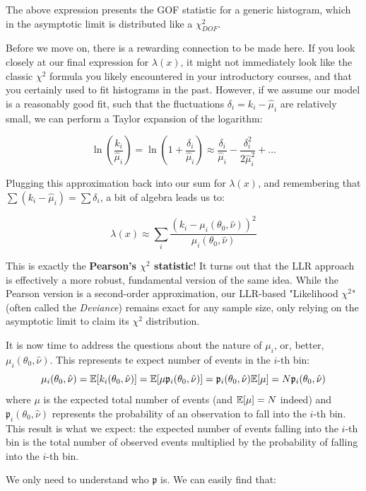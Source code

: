 The above expression presents the GOF statistic for a generic histogram, which in the asymptotic limit is distributed like a $\chi^2_{DOF}$.

Before we move on, there is a rewarding connection to be made here. If you look closely at our final expression for $\lambda(x)$, it might not immediately look like the classic $\chi^2$ formula you likely encountered in your introductory courses, and that you certainly used to fit histograms in the past. However, if we assume our model is a reasonably good fit, such that the fluctuations $\delta_i = k_i - \hat{\mu}_i$ are relatively small, we can perform a Taylor expansion of the logarithm:
	
	\[
	\ln\left(\frac{k_i}{\hat{\mu}_i}\right) = \ln\left(1 + \frac{\delta_i}{\hat{\mu}_i}\right) \approx \frac{\delta_i}{\hat{\mu}_i} - \frac{\delta_i^2}{2\hat{\mu}_i^2} + \dots
	\]
	
Plugging this approximation back into our sum for $\lambda(x)$, and remembering that $\sum (k_i - \hat{\mu}_i) = \sum \delta_i$, a bit of algebra leads us to:
	
	\[
	\lambda(x) \approx \sum_i \frac{(k_i - \mu_i(\theta_0,\hat{\nu}))^2}{\mu_i(\theta_0,\hat{\nu})}
	\]
	
This is exactly the \textbf{Pearson's $\chi^2$ statistic}! It turns out that the LLR approach is effectively a more robust, fundamental version of the same idea. While the Pearson version is a second-order approximation, our LLR-based "Likelihood $\chi^2$" (often called the \emph{Deviance}) remains exact for any sample size, only relying on the asymptotic limit to claim its $\chi^2$ distribution.

It is now time to address the questions about the nature of $\mu_i$, or, better, $\mu_i(\theta_0, \hat\nu)$. This represents te expect number of events in the $i$-th bin:
\[
	\mu_i(\theta_0, \hat\nu)=\mathbb{E}[k_i(\theta_0, \hat\nu)]=\mathbb{E}[\mu\mathfrak{p}_i(\theta_0, \hat\nu)]=\mathfrak{p}_i(\theta_0, \hat\nu)\mathbb{E}[\mu]=N\mathfrak{p}_i(\theta_0, \hat\nu)
\]
where $\mu$ is the expected total number of events (and $\mathbb{E}[\mu]=N$ indeed) and $\mathfrak{p}_i(\theta_0, \hat\nu)$ represents the probability of an observation to fall into the $i$-th bin. This result is what we expect: the expected number of events falling into the $i$-th bin is the total number of observed events multiplied by the probability of falling into the $i$-th bin.

We only need to understand who $\mathfrak{p}$ is. We can easily find that:

